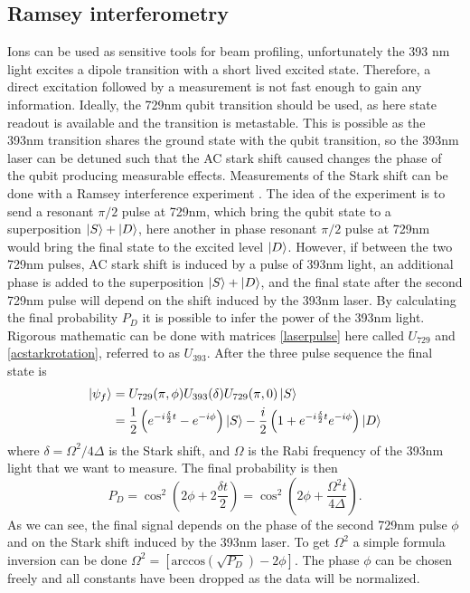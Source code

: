 \subsection{Ramsey interferometry}
Ions can be used as sensitive tools for beam profiling, unfortunately the 393 nm light excites a dipole transition with a short lived excited state. Therefore, a direct excitation followed by a measurement is not fast enough to gain any information. Ideally, the 729nm qubit transition should be used, as here state readout is available and the transition is metastable. This is possible as the 393nm transition shares the ground state with the qubit transition, so the 393nm laser can be detuned such that the AC stark shift caused changes the phase of the qubit producing measurable effects. Measurements of the Stark shift can be done with a Ramsey interference experiment \cite{starkshift}.
The idea of the experiment is to send a resonant $\pi/2$ pulse at 729nm, which bring the qubit state to a superposition $\ket{S}+\ket{D}$, here another in phase resonant $\pi/2$ pulse at 729nm would bring the final state to the excited level $\ket{D}$. However, if between the two 729nm pulses, AC stark shift is induced by a pulse of 393nm light, an additional phase is added to the superposition $\ket{S}+\ket{D}$, and the final state after the second 729nm pulse will depend on the shift induced by the 393nm laser. By calculating the final probability $P_D$ it is possible to infer the power of the 393nm light. Rigorous mathematic can be done with matrices \eqref{laserpulse} here called $U_{729}$ and \eqref{acstarkrotation}, referred to as $U_{393}$. After the three pulse sequence the final state is
\begin{equation}
\begin{split}
\ket{\psi_f} &= U_{729}(\pi,\phi)U_{393}(\delta)U_{729}(\pi,0)\ket{S} \\
&= \frac{1}{2}\left(e^{-i\frac{\delta}{2}t}-e^{-i\phi}\right)\ket{S}-\frac{i}{2}\left(1 + e^{-i\frac{\delta}{2}t} e^{-i\phi}\right)\ket{D}
\end{split}
\end{equation}
where $\delta = \Omega^2/4\Delta$ is the Stark shift, and $\Omega$ is the Rabi frequency of the 393nm light that we want to measure. The final probability is then
\begin{equation}
P_D = \cos^2\left(2\phi + 2\frac{\delta t}{2}\right) = \cos^2\left(2\phi + \frac{\Omega^2 t}{4\Delta}\right).
\end{equation}
As we can see, the final signal depends on the phase of the second 729nm pulse $\phi$ and on the Stark shift induced by the 393nm laser. To get $\Omega^2$ a simple formula inversion can be done $\Omega^2 = \left[\text{arccos}\left(\sqrt{P_D}\right)-2\phi \right]$. The phase $\phi$ can be chosen freely and all constants have been dropped as the data will be normalized.\\
